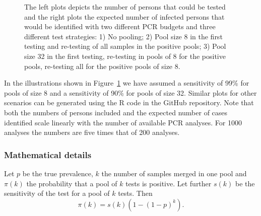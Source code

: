 \documentclass[10pt]{article}
\begin{document}
\begin{figure}[!hbt]
\begin{center}
\end{center}
\caption{The left plots depicts the number of persons that could be tested and the right plots the expected number of infected persons that would be identified with two different PCR budgets and three different test strategies: 1) No pooling; 2) Pool size 8 in the first testing and re-testing of all samples in the positive pools; 3) Pool size 32 in the first testing, re-testing in pools of 8 for the positive pools, re-testing all for the positive pools of size 8.}
\label{S2}
\end{figure}


In the illustrations shown in Figure~\ref{S2}  we have assumed a sensitivity of 99\% for pools of size 8 and a sensitivity of 90\% for pools of size 32.  Similar plots for other scenarios can be generated using the R code in the GitHub repository. Note that both the numbers of persons included and the expected number of cases identified scale linearly with the number of available PCR analyses. For 1000 analyses the numbers are five times that of 200 analyses.

\subsubsection*{Mathematical details}

Let $p$ be the true prevalence, $k$ the number of samples merged in one pool and $\pi(k)$ the probability that a pool of $k$ tests is positive. Let further $s(k)$ be the sensitivity of the test for a pool of  $k$ tests. Then
\begin{equation}
\label{pip}
\pi(k)=s(k)(1-(1-p)^k).
\end{equation}
\end{document}
